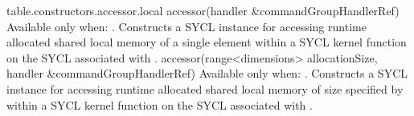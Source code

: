 {table.constructors.accessor.local}
  \addRow
    { accessor(handler \&commandGroupHandlerRef) }
    {
      Available only when: .
      \newline
      Constructs a SYCL  instance for accessing runtime
      allocated shared local memory of a single element within a SYCL kernel
      function on the SYCL  associated with .
    }
  \addRowTwoL
    { accessor(range<dimensions> allocationSize, }
    { handler \&commandGroupHandlerRef) }
    {
      Available only when: .
      \newline      
      Constructs a SYCL  instance for accessing runtime
      allocated shared local memory of size specified by  within a SYCL kernel function on the SYCL  associated with .
    }
\completeTable

